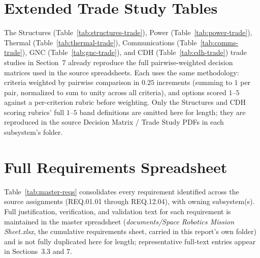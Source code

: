 \documentclass[11pt]{article}
\begin{document}
\newpage
\begin{appendices}

\section{Extended Trade Study Tables}
The Structures (Table~\ref{tab:structures-trade}), Power (Table~\ref{tab:power-trade}), Thermal
(Table~\ref{tab:thermal-trade}), Communications (Table~\ref{tab:comms-trade}), GNC
(Table~\ref{tab:gnc-trade}), and CDH (Table~\ref{tab:cdh-trade}) trade studies in Section~7
already reproduce the full pairwise-weighted decision matrices used in the source spreadsheets.
Each uses the same methodology: criteria weighted by pairwise comparison in $0.25$ increments
(summing to $1$ per pair, normalized to sum to unity across all criteria), and options scored
$1$--$5$ against a per-criterion rubric before weighting. Only the Structures and CDH scoring
rubrics' full $1$--$5$ band definitions are omitted here for length; they are reproduced in the
source Decision Matrix / Trade Study PDFs in each subsystem's folder.

\section{Full Requirements Spreadsheet}
Table~\ref{tab:master-reqs} consolidates every requirement identified across the source
assignments (REQ.01.01 through REQ.12.04), with owning subsystem(s). Full justification,
verification, and validation text for each requirement is maintained in the master spreadsheet
(\textit{documents/Space Robotics Mission Sheet.xlsx}, the cumulative requirements sheet, carried
in this report's own folder) and is not fully duplicated here for length; representative
full-text entries appear in Sections~3.3 and 7.


\end{appendices}
\end{document}
